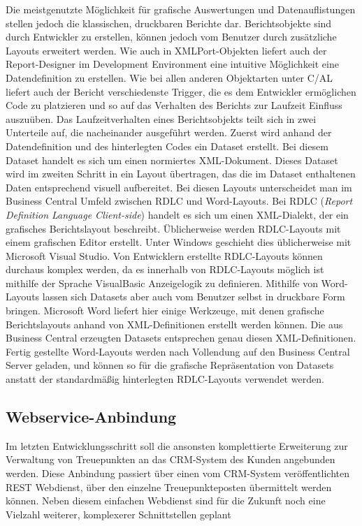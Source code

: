 Die meistgenutzte Möglichkeit für grafische Auswertungen und Datenauflistungen stellen jedoch die klassischen, druckbaren Berichte dar. Berichtsobjekte sind durch Entwickler zu erstellen, können jedoch vom Benutzer durch zusätzliche Layouts erweitert werden. Wie auch in XMLPort-Objekten liefert auch der Report-Designer im Development Environment eine intuitive Möglichkeit eine Datendefinition zu erstellen. Wie bei allen anderen Objektarten unter C/AL liefert auch der Bericht verschiedenste Trigger, die es dem Entwickler ermöglichen Code zu platzieren und so auf das Verhalten des Berichts zur Laufzeit Einfluss auszuüben. Das Laufzeitverhalten eines Berichtsobjekts teilt sich in zwei Unterteile auf, die nacheinander ausgeführt werden. Zuerst wird anhand der Datendefinition und des hinterlegten Codes ein Dataset erstellt. Bei diesem Dataset handelt es sich um einen normiertes XML-Dokument. Dieses Dataset wird im zweiten Schritt in ein Layout übertragen, das die im Dataset enthaltenen Daten entsprechend visuell aufbereitet.
Bei diesen Layouts unterscheidet man im Business Central Umfeld zwischen RDLC und Word-Layouts. Bei RDLC (\textit{Report Definition Language Client-side}) handelt es sich um einen XML-Dialekt, der ein grafisches Berichtslayout beschreibt. Üblicherweise werden RDLC-Layouts mit einem grafischen Editor erstellt. Unter Windows geschieht dies üblicherweise mit Microsoft Visual Studio. Von Entwicklern erstellte RDLC-Layouts können durchaus komplex werden, da es innerhalb von RDLC-Layouts möglich ist mithilfe der Sprache VisualBasic Anzeigelogik zu definieren. Mithilfe von Word-Layouts lassen sich Datasets aber auch vom Benutzer selbst in druckbare Form bringen. Microsoft Word liefert hier einige Werkzeuge, mit denen grafische Berichtslayouts anhand von XML-Definitionen erstellt werden können. Die aus Business Central erzeugten Datasets entsprechen genau diesen XML-Definitionen. Fertig gestellte Word-Layouts werden nach Vollendung auf den Business Central Server geladen, und können so für die grafische Repräsentation von Datasets anstatt der standardmäßig hinterlegten RDLC-Layouts verwendet werden.

\subsection{Webservice-Anbindung}
Im letzten Entwicklungsschritt soll die ansonsten komplettierte Erweiterung zur Verwaltung von Treuepunkten an das CRM-System des Kunden angebunden werden. Diese Anbindung passiert über einen vom CRM-System veröffentlichten REST Webdienst, über den einzelne Treuepunkteposten übermittelt werden können. Neben diesem einfachen Webdienst sind für die Zukunft noch eine Vielzahl weiterer, komplexerer Schnittstellen geplant

